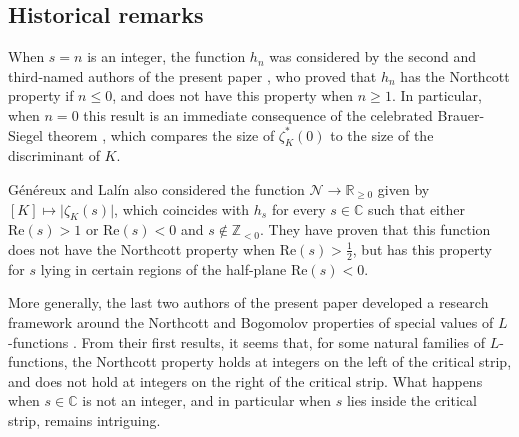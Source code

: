 \documentclass[10pt,a4paper]{amsart}
\theoremstyle{plain}
\theoremstyle{definition}
\theoremstyle{remark}
\begin{document}
    \subsection{Historical remarks}
    When $s = n$ is an integer, the function $h_n$ was considered by the second and third-named authors of the present paper \cite[Theorem~1.2]{Pazuki_Pengo_2024}, who proved that $h_n$ has the Northcott property if $n \leq 0$, and does not have this property when $n \geq 1$.
    In particular, when $n = 0$ this result is an immediate consequence of the celebrated Brauer-Siegel theorem \cite[Theorem~2]{Brauer_1947}, which compares the size of $\zeta^\ast_K(0)$ to the size of the discriminant of $K$.

    Généreux and Lalín \cite{GeLa24} also considered the function $\mathcal{N} \to \mathbb{R}_{\geq 0}$ given by $[K] \mapsto \lvert \zeta_K(s) \rvert$, which coincides with $h_s$ for every $s \in \mathbb{C}$ such that either $\mathrm{Re}(s) > 1$ or $\mathrm{Re}(s) < 0$ and $s \not\in \mathbb{Z}_{< 0}$.
    They have proven that this function does not have the Northcott property when $\mathrm{Re}(s) > \frac{1}{2}$, but has this property for $s$ lying in certain regions of the half-plane $\mathrm{Re}(s) < 0$.

More generally, the last two authors of the present paper developed a research framework around the Northcott and Bogomolov properties of special values of $L$-functions \cite{Pazuki_Pengo_2024}. From their first results, it seems that, for some natural families of $L$-functions, the Northcott property holds at integers on the left of the critical strip, and does not hold at integers on the right of the critical strip. What happens when $s \in \mathbb{C}$ is not an integer, and in particular when $s$ lies inside the critical strip, remains intriguing. 
\end{document}
